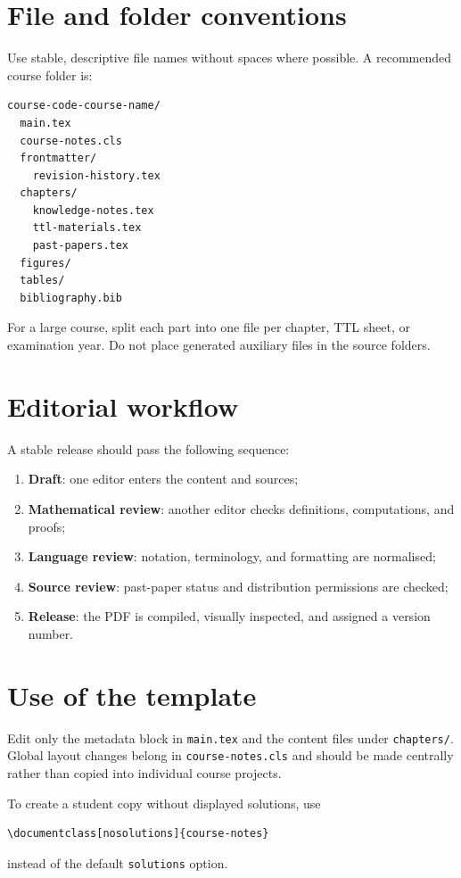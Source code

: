 \section{File and folder conventions}

Use stable, descriptive file names without spaces where possible. A recommended course
folder is:
\begin{verbatim}
course-code-course-name/
  main.tex
  course-notes.cls
  frontmatter/
    revision-history.tex
  chapters/
    knowledge-notes.tex
    ttl-materials.tex
    past-papers.tex
  figures/
  tables/
  bibliography.bib
\end{verbatim}

For a large course, split each part into one file per chapter, TTL sheet, or examination
year. Do not place generated auxiliary files in the source folders.

\section{Editorial workflow}

A stable release should pass the following sequence:
\begin{enumerate}
  \item \textbf{Draft}: one editor enters the content and sources;
  \item \textbf{Mathematical review}: another editor checks definitions, computations,
        and proofs;
  \item \textbf{Language review}: notation, terminology, and formatting are normalised;
  \item \textbf{Source review}: past-paper status and distribution permissions are
        checked;
  \item \textbf{Release}: the PDF is compiled, visually inspected, and assigned a
        version number.
\end{enumerate}

\section{Use of the template}

Edit only the metadata block in \texttt{main.tex} and the content files under
\texttt{chapters/}. Global layout changes belong in \texttt{course-notes.cls} and
should be made centrally rather than copied into individual course projects.

To create a student copy without displayed solutions, use
\begin{verbatim}
\documentclass[nosolutions]{course-notes}
\end{verbatim}
instead of the default \texttt{solutions} option.

